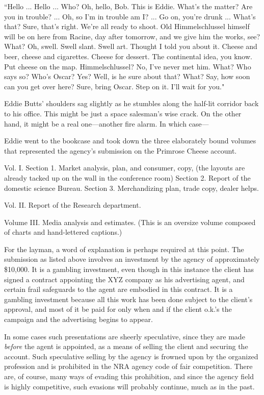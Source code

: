 \documentclass[openany,nobib]{tufte-book}
\begin{document}
``Hello ... Hello ... Who? Oh, hello, Bob. This is Eddie. What's the
matter? Are you in trouble? ... Oh, so I'm in trouble am I? ... Go on,
you're drunk ... What's that? Sure, that's right. We're all ready to
shoot. Old Himmelschlussel himself will be on here from Racine, day
after tomorrow, and we give him the works, see? What? Oh, swell. Swell
slant. Swell art. Thought I told you about it. Cheese and beer, cheese
and cigarettes. Cheese for dessert. The continental idea, you know. Put
cheese on the map. Himmelschlussel? No, I've never met him. What? Who
says so? Who's Oscar? Yes? Well, is he sure about that? What? Say, how
soon can you get over here? Sure, bring Oscar. Step on it. I'll wait for
you."

Eddie Butts' shoulders sag slightly as he stumbles along the half-lit
corridor back to his office. This might be just a space salesman's wise
crack. On the other hand, it might be a real one---another fire alarm.
In which case---

Eddie went to the bookcase and took down the three elaborately bound
volumes that represented the agency's submission on the Primrose Cheese
account.

Vol. I. Section 1. Market analysis, plan, and consumer, copy, (the
layouts are already tacked up on the wall in the conference room)
Section 2. Report of the domestic science Bureau. Section 3.
Merchandizing plan, trade copy, dealer helps.

Vol. II. Report of the Research department.

Volume III. Media analysis and estimates. (This is an oversize volume
composed of charts and hand-lettered captions.)

For the layman, a word of explanation is perhaps required at this point.
The submission as listed above involves an investment by the agency of
approximately \$10,000. It is a gambling investment, even though in this
instance the client has signed a contract appointing the XYZ company as
his advertising agent, and certain frail safeguards to the agent are
embodied in this contract. It is a gambling investment because all this
work has been done subject to the client's approval, and most of it be
paid for only when and if the client o.k.'s the campaign and the
advertising begins to appear.

In some cases such presentations are sheerly speculative, since they are
made \emph{before} the agent is appointed, as a means of selling the
client and securing the account. Such speculative selling by the agency
is frowned upon by the organized profession and is prohibited in the NRA
agency code of fair competition. There are, of course, many ways of
evading this prohibition, and since the agency field is highly
competitive, such evasions will probably continue, much as in the past.
\end{document}
